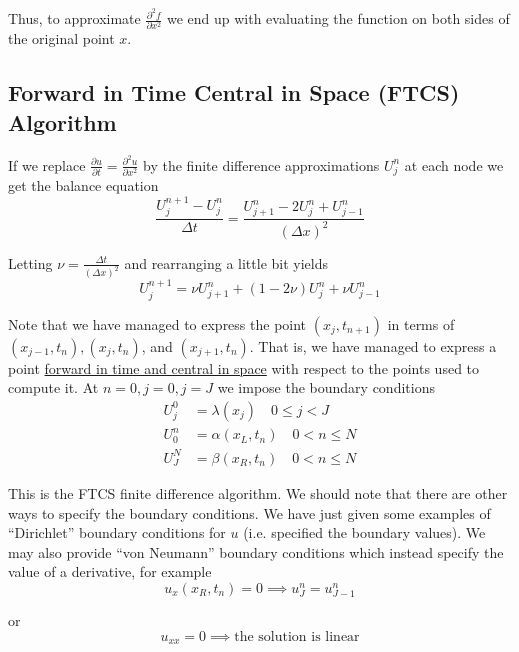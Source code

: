 \documentclass[12pt]{article}
\newlength\tindent
\renewcommand{\indent}{\hspace*{\tindent}}
\begin{document}
\indent Thus, to approximate $\frac{ \partial^2 f }{\partial x^2}$ we end up with evaluating the function on both sides of the original point $x$.

\subsection{Forward in Time Central in Space (FTCS) Algorithm}

\indent If we replace $\frac{\partial u}{\partial t} = \frac{\partial^2 u }{\partial x^2}$ by the finite difference approximations $U^n_j$ at each node we get the balance equation
\begin{equation*}
	\frac{ U^{n + 1}_j - U^n_j }{ \Delta t } = \frac{ U^n_{j + 1} - 2U^n_j + U^n_{j - 1}}{ (\Delta x)^2 }
\end{equation*}

Letting $\nu = \frac{\Delta t}{(\Delta x)^2}$ and rearranging a little bit yields
\begin{equation*}
	U^{n + 1}_j = \nu U^n_{j + 1} + (1 - 2\nu)U^n_j + \nu U^n_{j - 1}
\end{equation*}

\indent Note that we have managed to express the point $(x_j, t_{n + 1})$ in terms of $(x_{j - 1}, t_n), (x_j, t_n)$, and $(x_{j + 1}, t_n)$. That is, we have managed to express a point \underline{forward in time and central in space} with respect to the points used to compute it. At $n = 0, j = 0, j = J$ we impose the boundary conditions
\begin{align*}
	U^0_j &= \lambda(x_j) \quad 0 \leq j < J \\
	U^n_0 &= \alpha(x_L, t_n) \quad 0 < n \leq N \\
	U^N_J &= \beta(x_R, t_n) \quad 0 < n \leq N
\end{align*}

\indent This is the FTCS finite difference algorithm. We should note that there are other ways to specify the boundary conditions. We have just given some examples of ``Dirichlet'' boundary conditions for $u$ (i.e. specified the boundary values). We may also provide ``von Neumann'' boundary conditions which instead specify the value of a derivative, for example
\begin{equation*}
	u_x(x_R, t_n) = 0 \implies u^n_J = u^n_{J - 1}
\end{equation*}

or
\begin{equation*}
	u_{xx} = 0 \implies \text{the solution is linear}
\end{equation*}
\end{document}
